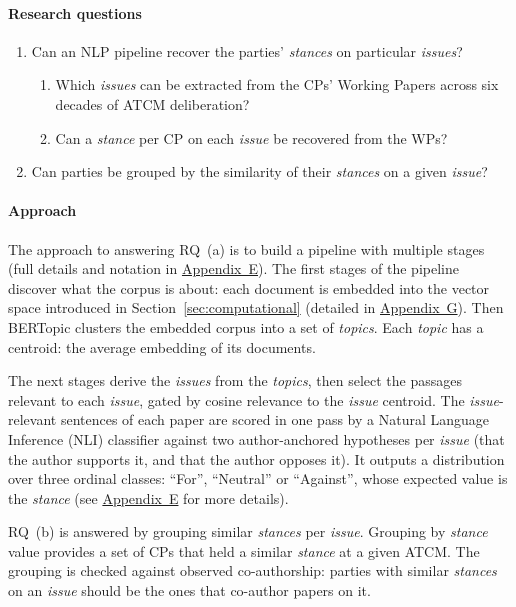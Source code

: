 \paragraph{Research questions}
\begin{enumerate}[label=\alph*.]
  \item Can an NLP pipeline recover the parties' \textit{stances} on particular \textit{issues}?
  \begin{enumerate}[label=\roman*.]
    \item Which \textit{issues} can be extracted from the CPs' Working Papers across six decades
    of ATCM deliberation?
    \item Can a \textit{stance} per CP on each \textit{issue} be recovered from the WPs?
  \end{enumerate}
  \item Can parties be grouped by the similarity of their \textit{stances} on a given
  \textit{issue}?
\end{enumerate}

\paragraph{Approach}
The approach to answering RQ~(a) is to build a pipeline with multiple stages (full details and
notation in \hyperref[app:e]{Appendix~E}). The first stages of the pipeline discover what the
corpus is about: each document is embedded into the vector space introduced in
Section~\ref{sec:computational} (detailed in \hyperref[app:g]{Appendix~G}). Then BERTopic
\parencite{Grootendorst_BERTopic} clusters the embedded corpus into a set of \textit{topics}.
Each \textit{topic} has a centroid: the average embedding of its documents.

The next stages derive the \textit{issues} from the \textit{topics}, then select the passages
relevant to each \textit{issue}, gated by cosine relevance to the \textit{issue} centroid. The
\textit{issue}-relevant sentences of each paper are scored in one pass by a Natural Language
Inference (NLI) classifier against two author-anchored hypotheses per \textit{issue} (that the
author supports it, and that the author opposes it). It outputs a distribution over three ordinal
classes: ``For'', ``Neutral'' or ``Against'', whose expected value is the \textit{stance} (see
\hyperref[app:e]{Appendix~E} for more details).

RQ~(b) is answered by grouping similar \textit{stances} per \textit{issue}. Grouping by
\textit{stance} value provides a set of CPs that held a similar \textit{stance} at a given ATCM.
The grouping is checked against observed co-authorship: parties with similar \textit{stances} on
an \textit{issue} should be the ones that co-author papers on it.

